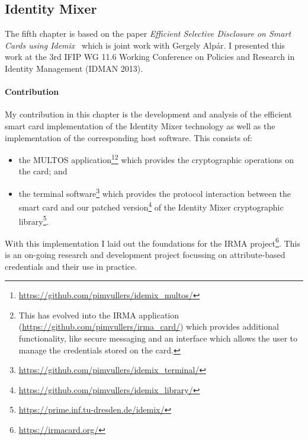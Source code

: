 \subsection{Identity Mixer}

The fifth chapter is based on the paper \emph{Efficient Selective Disclosure on
Smart Cards using Idemix}~\cite{VullersAlpar2013} which is joint work with
Gergely Alp\'ar. I presented this work at the 3rd IFIP WG 11.6 Working
Conference on Policies and Research in Identity Management (IDMAN 2013).

\paragraph{Contribution}

My contribution in this chapter is the development and analysis of the efficient
smart card implementation of the Identity Mixer technology as well as the
implementation of the corresponding host software. This consists of:
\begin{itemize}
  \item the MULTOS application\footnote{\url{https://github.com/pimvullers/idemix_multos/}
    }\footnote{This has evolved into the IRMA application
    (\url{https://github.com/pimvullers/irma_card/}) which provides additional
    functionality, like secure messaging and an interface which allows the user
    to manage the credentials stored on the card.}
    which provides the cryptographic operations on the card; and
  \item the terminal software\footnote{\url{https://github.com/pimvullers/idemix_terminal/}}
    which provides the protocol interaction between the smart card and our
    patched version\footnote{\url{https://github.com/pimvullers/idemix_library/}}
    of the Identity Mixer cryptographic library\footnote{\url{https://prime.inf.tu-dresden.de/idemix/}}.
\end{itemize}

With this implementation I laid out the foundations %
for the IRMA project\footnote{\url{https://irmacard.org/}}. This is an on-going
research and development project focussing on attribute-based credentials and
their use in practice.
